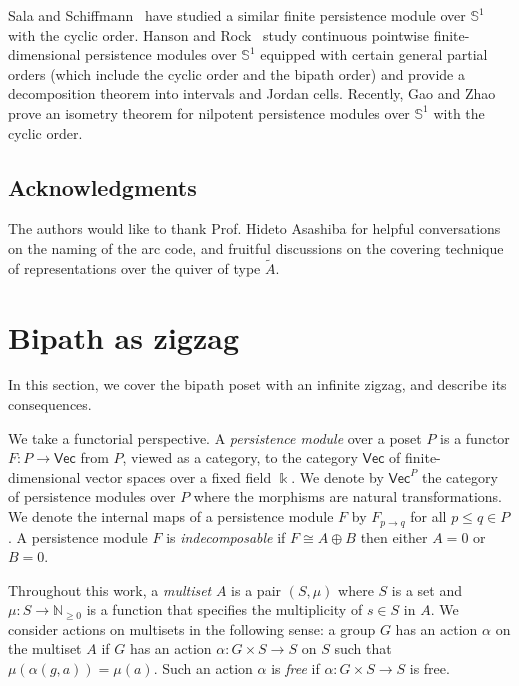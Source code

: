 \documentclass[a4paper,english,reqno]{amsart}
\newcommand{\deff}{\textit}
\renewcommand\k{\Bbbk}
\newcommand\iso{\cong}
\newcommand\N{\mathbb{N}}
\newcommand\bS{\mathbb{S}}
\newcommand{\cat}[1]{\ensuremath{\mathsf{#1}}}
\renewcommand{\Vec}{\cat{Vec}}
\theoremstyle{plain}
\theoremstyle{definition} %
\begin{document}
Sala and Schiffmann~\cite{salaFockSpaceRepresentation2021} have studied a similar finite persistence module over $\bS^{1}$ with the cyclic order. Hanson and Rock~\cite{hansonDecompositionPointwiseFinitedimensional2024} study
continuous pointwise finite-dimensional persistence modules over $\bS^{1}$
equipped with certain general partial orders (which include the cyclic order and the bipath order) and provide a decomposition theorem into intervals and Jordan cells. 
 Recently, Gao and Zhao~\cite{gaoIsometryTheoremContinuous2024} prove an isometry theorem for nilpotent persistence modules over $\bS^{1}$ with the cyclic order.

\subsection{Acknowledgments}
The authors would like to thank Prof. Hideto Asashiba for helpful
conversations on the naming of the arc code, and fruitful discussions on the covering technique of representations over the quiver of type $\tilde{A}$.

\section{Bipath as zigzag}\label{sec:bipath_as_zigzag}

In this section, we cover the bipath poset with an infinite zigzag, and describe its consequences.

We take a functorial perspective. A \deff{persistence module} over a poset $P$ is a functor $F\colon P\to\Vec$ from $P$, viewed as a category, to the category $\Vec$ of finite-dimensional vector spaces over a fixed field $\k$. We denote by $\Vec^P$ the category of persistence modules over $P$ where the morphisms are natural transformations. We denote the internal maps of a persistence module $F$ by $F_{p\to q}$ for all $p\leq q \in P$. A persistence module $F$ is \deff{indecomposable} if $F\iso A\oplus B$ then either $A = 0$ or $B = 0$.

Throughout this work, a \deff{multiset} $A$ is a pair $(S, \mu)$ where $S$ is a set and $\mu\colon S\to\N_{\ge 0}$ is a function that specifies the multiplicity of $s\in S$ in $A$. We consider actions on multisets in the following sense: a group $G$ has an action $\alpha$ on the multiset $A$ if $G$ has an action $\alpha\colon G\times S\to S$ on $S$ such that $\mu(\alpha(g, a)) = \mu(a)$. Such an action $\alpha$ is \deff{free} if $\alpha\colon G\times S\to S$ is free.
\end{document}
